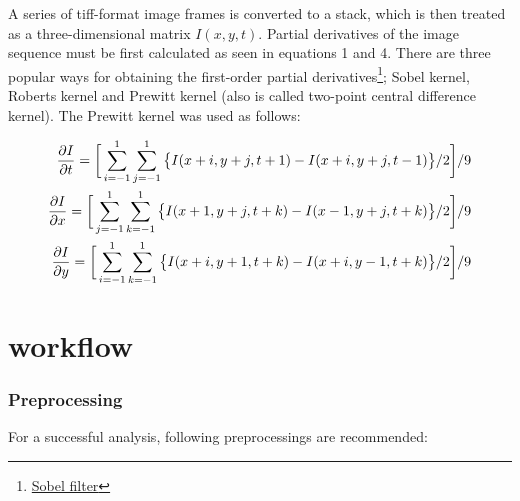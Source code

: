 \documentclass{article}
\begin{document}
A series of tiff-format image frames is converted to a stack, which is
then treated as a three-dimensional matrix \(I(x,y,t)\). Partial
derivatives of the image sequence must be first calculated as seen in
equations 1 and 4. There are three popular ways for obtaining the
first-order partial derivatives\footnote{\href{http://homepages.inf.ed.ac.uk/rbf/HIPR2/sobel.htm}{Sobel
  filter}}; Sobel kernel, Roberts kernel and Prewitt kernel (also is
called two-point central difference kernel). The Prewitt kernel was used
as follows:

\begin{subequations}
\begin{align}
\frac{\partial I}{\partial t} = \bigg{[}\sum^1_{i=-1}\sum^1_{j=-1}\big{\{}I(x+i, y+j, t+1) - I(x+i, y+j, t-1)\big\}/2\bigg{]}/9
\\
\frac{\partial I}{\partial x} = \bigg{[}\sum^1_{j=-1}\sum^1_{k=-1}\big{\{}I(x+1, y+j, t+k) - I(x-1, y+j, t+k)\big\}/2\bigg{]}/9
\\
\frac{\partial I}{\partial y} = \bigg{[}\sum^1_{i=-1}\sum^1_{k=-1}\big{\{}I(x+i, y+1, t+k) - I(x+i, y-1, t+k)\big\}/2\bigg{]}/9
\end{align}
\end{subequations}

\section{workflow}\label{sec:workflow}

\subsubsection{Preprocessing}\label{preprocessing}

For a successful analysis, following preprocessings are recommended:
\end{document}
